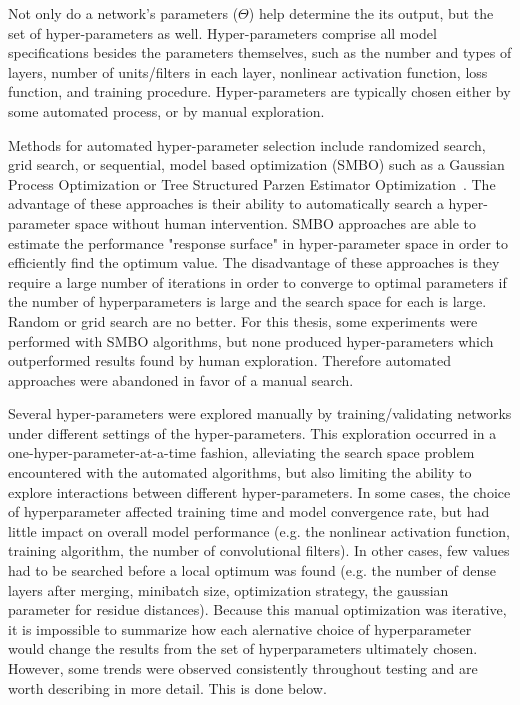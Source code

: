 Not only do a network's parameters ($\Theta$) help determine the its output, but the set of hyper-parameters as well.
Hyper-parameters comprise all model specifications besides the parameters themselves, such as the number and types of layers, number of units/filters in each layer, nonlinear activation function, loss function, and training procedure.
Hyper-parameters are typically chosen either by some automated process, or by manual exploration.

Methods for automated hyper-parameter selection include randomized search, grid search, or  sequential, model based optimization (SMBO) such as a Gaussian Process Optimization or Tree Structured Parzen Estimator Optimization~\cite{bergstra2011}.
The advantage of these approaches is their ability to automatically search a hyper-parameter space without human intervention. 
SMBO approaches are able to estimate the performance "response surface" in hyper-parameter space in order to efficiently find the optimum value.
The disadvantage of these approaches is they require a large number of iterations in order to converge to optimal parameters if the number of hyperparameters is large and the search space for each is large. 
Random or grid search are no better.
For this thesis, some experiments were performed with SMBO algorithms, but none produced hyper-parameters which outperformed results found by human exploration.
Therefore automated approaches were abandoned in favor of a manual search.

Several hyper-parameters were explored manually by training/validating networks under different settings of the hyper-parameters.
This exploration occurred in a one-hyper-parameter-at-a-time fashion, alleviating the search space problem encountered with the automated algorithms, but also limiting the ability to explore interactions between different hyper-parameters.
In some cases, the choice of hyperparameter affected training time and model convergence rate, but had little impact on overall model performance (e.g. the nonlinear activation function, training algorithm, the number of convolutional filters).
In other cases, few values had to be searched before a local optimum was found (e.g. the number of dense layers after merging, minibatch size, optimization strategy, the gaussian parameter for residue distances).
Because this manual optimization was iterative, it is impossible to summarize how each alernative  choice of hyperparameter would change the results from the set of hyperparameters ultimately chosen.
However, some trends were observed consistently throughout testing and are worth describing in more detail.
This is done below.

